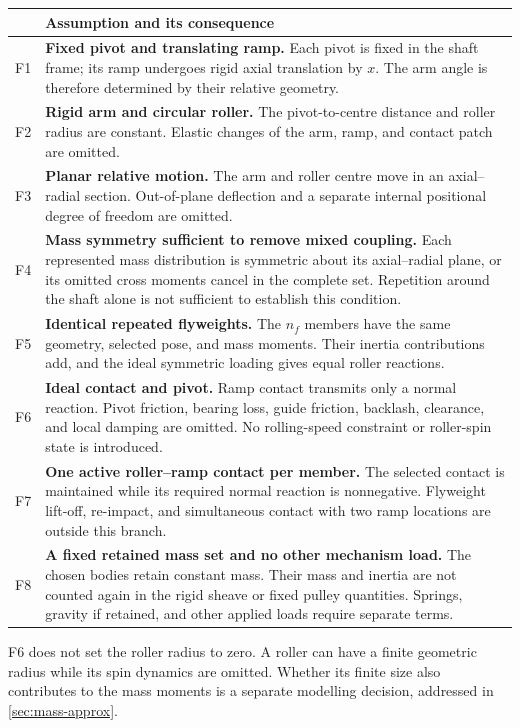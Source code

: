 \documentclass[11pt,letterpaper]{article}
\numberwithin{equation}{section}
\begin{document}
\begin{longtable}{@{}p{}p{}@{}}
\toprule
 & Assumption and its consequence\\
\midrule
\endhead
F1 & \textbf{Fixed pivot and translating ramp.} Each pivot is fixed in the shaft frame; its ramp undergoes rigid axial translation by $x$. The arm angle is therefore determined by their relative geometry.\\[.5em]
F2 & \textbf{Rigid arm and circular roller.} The pivot-to-centre distance and roller radius are constant. Elastic changes of the arm, ramp, and contact patch are omitted.\\[.5em]
F3 & \textbf{Planar relative motion.} The arm and roller centre move in an axial--radial section. Out-of-plane deflection and a separate internal positional degree of freedom are omitted.\\[.5em]
F4 & \textbf{Mass symmetry sufficient to remove mixed coupling.} Each represented mass distribution is symmetric about its axial--radial plane, or its omitted cross moments cancel in the complete set. Repetition around the shaft alone is not sufficient to establish this condition.\\[.5em]
F5 & \textbf{Identical repeated flyweights.} The $n_f$ members have the same geometry, selected pose, and mass moments. Their inertia contributions add, and the ideal symmetric loading gives equal roller reactions.\\[.5em]
F6 & \textbf{Ideal contact and pivot.} Ramp contact transmits only a normal reaction. Pivot friction, bearing loss, guide friction, backlash, clearance, and local damping are omitted. No rolling-speed constraint or roller-spin state is introduced.\\[.5em]
F7 & \textbf{One active roller--ramp contact per member.} The selected contact is maintained while its required normal reaction is nonnegative. Flyweight lift-off, re-impact, and simultaneous contact with two ramp locations are outside this branch.\\[.5em]
F8 & \textbf{A fixed retained mass set and no other mechanism load.} The chosen bodies retain constant mass. Their mass and inertia are not counted again in the rigid sheave or fixed pulley quantities. Springs, gravity if retained, and other applied loads require separate terms.\\
\bottomrule
\end{longtable}

F6 does not set the roller radius to zero. A roller can have a finite geometric radius while its spin dynamics are omitted. Whether its finite size also contributes to the mass moments is a separate modelling decision, addressed in \cref{sec:mass-approx}.
\end{document}
